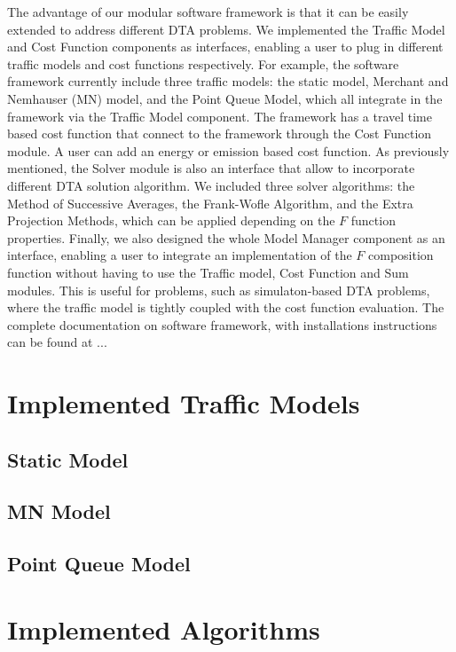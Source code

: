 \documentclass[conference]{IEEEtran}
\renewcommand{\:}{\mathrel{\coloneqq}}
\renewcommand{\=}{\ensuremath{\eqqcolon}}
\newcommand{\0}{\ensuremath{\boldsymbol{0}}}
\begin{document}
The advantage of our modular software framework is that it can be easily extended to address different DTA problems. We implemented the Traffic Model and Cost Function components as interfaces, enabling a user to plug in different traffic models and cost functions respectively. For example, the software framework currently include three traffic models: the static model, Merchant and Nemhauser (MN) model, and the Point Queue Model, which all integrate in the framework via the Traffic Model component. The framework has a travel time based cost function that connect to the framework through the Cost Function module. A user can add an energy or emission based cost function. As previously mentioned, the Solver module is also an interface that allow to incorporate different DTA solution algorithm. We included three solver algorithms: the Method of Successive Averages, the Frank-Wofle Algorithm, and the Extra Projection Methods, which can be applied depending on the $F$ function properties. Finally, we also designed the whole Model Manager component as an interface, enabling a user to integrate an implementation of the $F$ composition function without having to use the Traffic model, Cost Function and Sum modules. This is useful for problems, such as simulaton-based DTA problems, where the traffic model is tightly coupled with the cost function evaluation. The complete documentation on software framework, with installations instructions can be found at ...

\section{Implemented Traffic Models}
\subsection{Static Model}
\subsection{MN Model}
\subsection{Point Queue Model}

\section{Implemented Algorithms}
\end{document}
